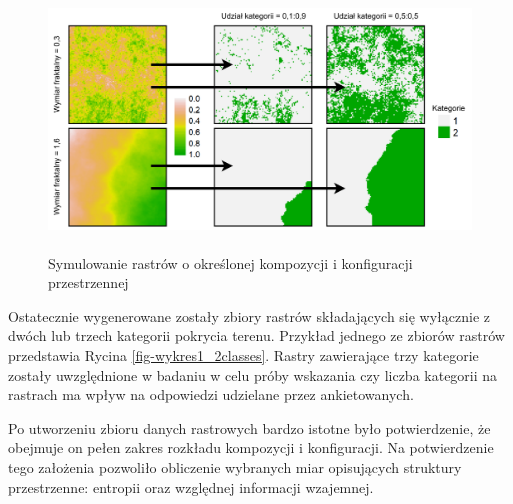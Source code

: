 \documentclass{amuthesis}
\begin{document}
\begin{figure}[t]

{\centering \includegraphics[width=5.20833in,height=2.70833in]{figures/diagram_rastersim_showcase.pdf}

}

\caption{\label{fig-diagram-symulowanie}Symulowanie rastrów o określonej
kompozycji i konfiguracji przestrzennej}

\end{figure}

Ostatecznie wygenerowane zostały zbiory rastrów składających się
wyłącznie z dwóch lub trzech kategorii pokrycia terenu. Przykład jednego
ze zbiorów rastrów przedstawia Rycina \ref{fig-wykres1_2classes}. Rastry
zawierające trzy kategorie zostały uwzględnione w badaniu w celu próby
wskazania czy liczba kategorii na rastrach ma wpływ na odpowiedzi
udzielane przez ankietowanych.

Po utworzeniu zbioru danych rastrowych bardzo istotne było
potwierdzenie, że obejmuje on pełen zakres rozkładu kompozycji i
konfiguracji. Na potwierdzenie tego założenia pozwoliło obliczenie
wybranych miar opisujących struktury przestrzenne: entropii oraz
względnej informacji wzajemnej.
\end{document}
